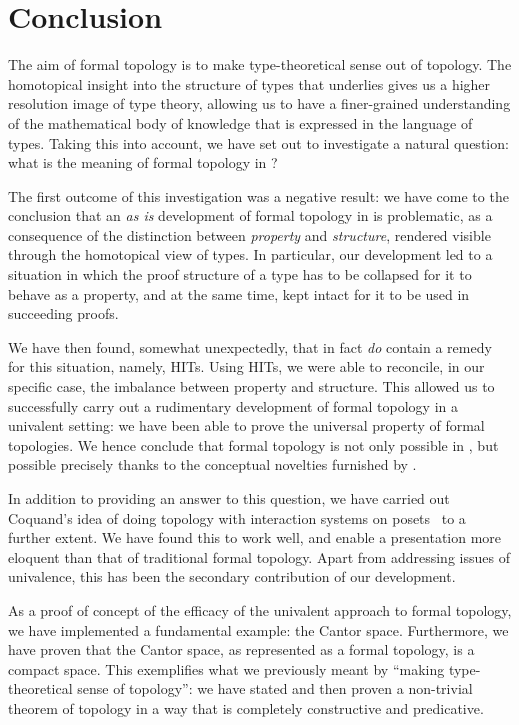 \chapter{Conclusion}\label{chap:conc}


The aim of formal topology is to make type-theoretical sense out of topology. The
homotopical insight into the structure of types that underlies \UF{} gives us a higher
resolution image of type theory, allowing us to have a finer-grained understanding of the
mathematical body of knowledge that is expressed in the language of types. Taking this
into account, we have set out to investigate a natural question: what is the meaning of
formal topology in \UF{}?

The first outcome of this investigation was a negative result: we have come to the
conclusion that an \emph{as is} development of formal topology in \UF{} is problematic, as
a consequence of the distinction between \emph{property} and \emph{structure}, rendered
visible through the homotopical view of types. In particular, our development led to a
situation in which the proof structure of a type has to be collapsed for it to behave as a
property, and at the same time, kept intact for it to be used in succeeding proofs.

We have then found, somewhat unexpectedly, that \UF{} in fact \emph{do} contain a remedy
for this situation, namely, HITs. Using HITs, we were able to reconcile, in our specific
case, the imbalance between property and structure. This allowed us to successfully carry
out a rudimentary development of formal topology in a univalent setting: we have been able
to prove the universal property of formal topologies. We hence conclude that formal
topology is not only possible in \UF{}, but possible precisely thanks to the conceptual
novelties furnished by \UF{}.

In addition to providing an answer to this question, we have carried out Coquand's idea of
doing topology with interaction systems on posets~\cite{coq-posets} to a further extent.
We have found this to work well, and enable a presentation more eloquent than that of
traditional formal topology. Apart from addressing issues of univalence, this has been the
secondary contribution of our development.

As a proof of concept of the efficacy of the univalent approach to formal topology, we
have implemented a fundamental example: the Cantor space. Furthermore, we have proven that
the Cantor space, as represented as a formal topology, is a compact space. This
exemplifies what we previously meant by ``making type-theoretical sense of topology'': we
have stated and then proven a non-trivial theorem of topology in a way that is completely
constructive and predicative.

